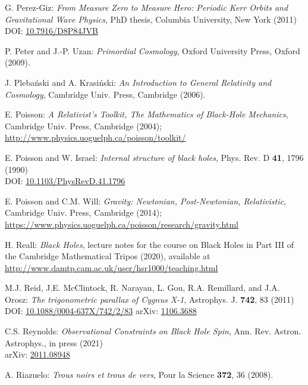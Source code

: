 \begin{thebibliography}{123}
G. Perez-Giz: {\em From Measure Zero to Measure Hero:
Periodic Kerr Orbits and Gravitational Wave Physics},
PhD thesis, Columbia University, New York (2011)\\
DOI: \href{https://doi.org/10.7916/D8P84JVB}{10.7916/D8P84JVB}

P. Peter and J.-P. Uzan: {\em Primordial Cosmology},
Oxford University Press, Oxford (2009).

J. Pleba\'nski and A. Krasi\'nski:
{\em An Introduction to General Relativity and Cosmology},
Cambridge Univ. Press, Cambridge (2006).

E. Poisson: \emph{A Relativist's Toolkit,
The Mathematics of Black-Hole Mechanics},
Cambridge Univ. Press, Cambridge (2004); \\
\url{http://www.physics.uoguelph.ca/poisson/toolkit/}

E. Poisson and W. Israel: {\em Internal structure of black holes},
Phys. Rev. D {\bf 41}, 1796 (1990) \\
DOI: \href{https://doi.org/10.1103/PhysRevD.41.1796}{10.1103/PhysRevD.41.1796}

E. Poisson and C.M. Will: {\em Gravity: Newtonian, Post-Newtonian, Relativistic},
Cambridge Univ. Press, Cambridge (2014); \\
\url{https://www.physics.uoguelph.ca/poisson/research/gravity.html}

H. Reall: {\em Black Holes}, lecture notes for the course on Black Holes in
Part III of the Cambridge Mathematical Tripos (2020), available at \\
\url{http://www.damtp.cam.ac.uk/user/hsr1000/teaching.html}

M.J. Reid, J.E. McClintock, R. Narayan, L. Gou, R.A. Remillard, and J.A. Orosz:
{\em The trigonometric parallax of Cygnus X-1},
Astrophys. J. {\bf 742}, 83 (2011)\\
DOI: \href{https://doi.org/10.1088/0004-637X/742/2/83}{10.1088/0004-637X/742/2/83}\hfill
arXiv: \href{https://arxiv.org/abs/1106.3688}{1106.3688}

C.S. Reynolds:
{\em Observational Constraints on Black Hole Spin},
Ann. Rev. Astron. Astrophys., in press (2021)\\
arXiv: \href{https://arxiv.org/abs/2011.08948}{2011.08948}

A. Riazuelo:
{\em Trous noirs et trous de vers},
Pour la Science {\bf 372}, 36 (2008).


\end{thebibliography}
